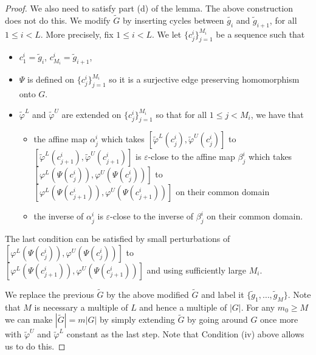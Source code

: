 \documentclass[11pt]{amsart}
\begin{document}
{\begin{proof}
    We also need to satisfy part (d) of the lemma. The above construction does not do this. We modify $\tilde {G}$ by inserting cycles between $\tilde{g_i}$ and $\tilde{g}_{i+1}$, for all $1 \le i < L$. More precisely, fix $1 \le i < L$. We let $\{c^i_j\}_{j=1}^{M_i}$ be a sequence such that 
    \begin{itemize}
        \item $c^i_1 = \tilde{g}_i$, $c^i_{M_i} = \tilde{g}_{i+1}$,
        \item $\Psi$ is defined on $\{c^i_j\}_{j=1}^{M_i}$ so it is a surjective edge preserving homomorphism onto $G$.
        \item $\tilde{\varphi}^L$ and $\tilde{\varphi}^U$ are  extended on $\{c^i_j\}_{j=1}^{M_i}$ so that for all $1 \le j < M_i$, we have that 
        \begin{itemize}
            \item the affine map $\alpha^i_j$ which takes $[\tilde{\varphi}^L(c^i_j), \tilde{\varphi}^U(c^i_j)]$ to $[\tilde{\varphi}^L(c^i_{j+1}), \tilde{\varphi}^U(c^i_{j+1})]$ is $\varepsilon$-close to the affine map $\beta^i_j$ which takes $[\varphi^L(\Psi(c^i_j)), \varphi^U(\Psi(c^i_j))]$ to\\ $[\varphi^L(\Psi(c^i_{j+1})), \varphi^U(\Psi(c^i_{j+1}))]$ on their common domain 
            \item  the inverse of $\alpha^i_j$ is $\varepsilon$-close to the inverse of $\beta^i_j$ on their common domain.  
        \end{itemize}
    \end{itemize} 
    The last condition can be satisfied by small perturbations of  $[\varphi^L(\Psi(c^i_j)), \varphi^U(\Psi(c^i_j))]$ to\\ $[\varphi^L(\Psi(c^i_{j+1})), \varphi^U(\Psi(c^i_{j+1}))]$ and  using sufficiently large $M_i$.
    
We replace the previous $\tilde{G}$ by the above modified $\tilde{G}$ and label it $\{\tilde{g}_1, \ldots, \tilde{g}_M\}$. Note that $M$ is necessary a multiple of $L$ and hence a multiple of $|G|$. For any $m_0 \ge M$ we can make $|\tilde{G}| = m |G|$ by simply extending $\tilde{G}$ by going around $G$ once more with $\tilde{\varphi}^U$ and 
$\tilde{\varphi}^L$ constant as the last step. Note that Condition (iv) above allows us to do this. 
    
\end{proof}

}
\end{document}
